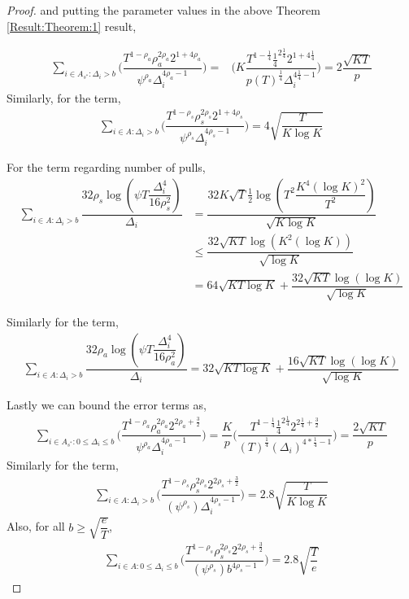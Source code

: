 \begin{proof}
and putting the parameter values in the above Theorem \ref{Result:Theorem:1} result,	
	
	\begin{align*}
	\sum_{i\in A_{s^{*}}:\Delta_{i} > b}\bigg(\dfrac{T^{1-\rho_{a}}\rho_{a}^{2\rho_{a}}2^{1+4\rho_{a}}}{\psi^{\rho_{a}}\Delta_{i}^{4\rho_{a}-1}} \bigg)=& \bigg(K\dfrac{T^{1-\frac{1}{4}}\frac{1}{4}^{2\frac{1}{4}}2^{1+4\frac{1}{4}}}{p(T)^{\frac{1}{4}}\Delta_{i}^{4\frac{1}{4}-1}} \bigg)=2\dfrac{\sqrt{KT}}{p}
	\end{align*}		
	 Similarly, for the term, 
	 \begin{align*}
	 \sum_{i\in A:\Delta_{i} > b}\bigg(\dfrac{T^{1-\rho_{s}}\rho_{s}^{2\rho_{s}}2^{1+4\rho_{s}}}{\psi^{\rho_{s}}\Delta_{i}^{4\rho_{s}-1}} \bigg) = 4\sqrt{\dfrac{T}{K\log K}}
	 \end{align*}
	 
	
	For the term regarding number of pulls,
	\begin{align*}
	\sum_{i\in A:\Delta_{i} > b}\dfrac{32\rho_{s}\log{(\psi T\dfrac{\Delta_{i}^{4}}{16\rho_{s}^{2}})}}{\Delta_{i}} &= \dfrac{32K\sqrt{T}\frac{1}{2}\log{(T^{2}\dfrac{K^{4}(\log K)^{2}}{T^{2}})}}{\sqrt{K\log K}}\\
	&\leq  \dfrac{32\sqrt{KT}\log{(K^{2}(\log K))}}{\sqrt{\log K}}\\
	&=64\sqrt{KT\log K} + \dfrac{32\sqrt{KT}\log{(\log K)}}{\sqrt{\log K}}
	\end{align*}		
	
	Similarly for the term,
	\begin{align*}
	\sum_{i\in A:\Delta_{i} > b}\dfrac{32\rho_{a}\log{(\psi T\dfrac{\Delta_{i}^{4}}{16\rho_{a}^{2}})}}{\Delta_{i}} = 32\sqrt{KT\log K} + \dfrac{16\sqrt{KT}\log{(\log K)}}{\sqrt{\log K}}
	\end{align*}		
	
 	Lastly we can bound the error terms as, 
	\begin{align*}
	\sum\limits_{i\in A_{s^{*}}:0\leq\Delta_{i}\leq b}\bigg(\dfrac{T^{1-\rho_{a}}\rho_{a}^{2\rho_{a}}2^{2\rho_{a}+\frac{3}{2}}}{\psi^{\rho_{a}}\Delta_{i}^{4\rho_{a}-1}} \bigg)=\dfrac{K}{p}\bigg(\dfrac{T^{1-\frac{1}{4}}\frac{1}{4}^{2\frac{1}{4}}2^{2\frac{1}{4}+\frac{3}{2}}}{{(T)^{\frac{1}{4}}}{(\Delta_{i})^{4*\frac{1}{4}-1}}} \bigg) = \dfrac{2 \sqrt{KT} }{p}
	\end{align*}	 	
 	Similarly for the term,
 	\begin{align*}
 	\sum\limits_{i\in A:\Delta_{i} > b}\bigg(\dfrac{T^{1-\rho_{s}}\rho_{s}^{2\rho_{s}}2^{2\rho_{s}+\frac{3}{2}}}{(\psi^{\rho_{s}})\Delta_{i}^{4\rho_{s} -1}} \bigg)= 2.8\sqrt{\dfrac{T}{K\log K}}
	\end{align*} 	
	Also, for all $b\geq \sqrt{\dfrac{e}{T}}$,
	\begin{align*}
 	\sum\limits_{i\in A:0\leq\Delta_{i}\leq b}\bigg(\dfrac{T^{1-\rho_{s}}\rho_{s}^{2\rho_{s}}2^{2\rho_{s}+\frac{3}{2}}}{(\psi^{\rho_{s}})b^{4\rho_{s} -1}} \bigg)= 2.8\sqrt{\dfrac{T}{e}}
	\end{align*} 	
 	

\end{proof}

